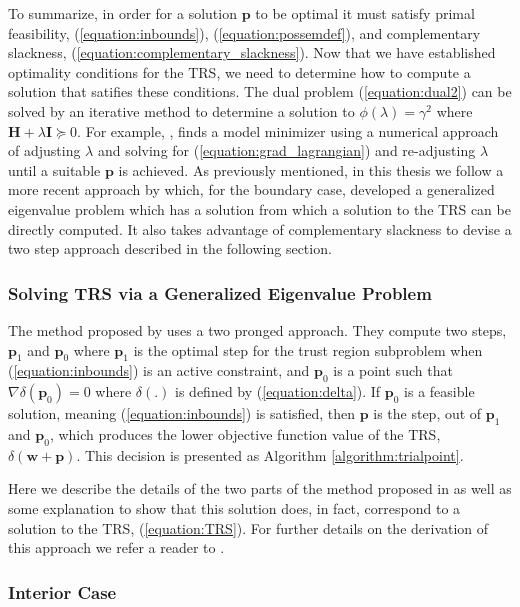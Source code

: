 \documentclass[letterpaper,12pt,titlepage,oneside,final]{book}
\begin{document}
	To summarize, in order for a solution $\mathbf{p}$ to be optimal it must satisfy primal feasibility, (\ref{equation:inbounds}), (\ref{equation:possemdef}), and complementary slackness, (\ref{equation:complementary_slackness}). Now that we have established optimality conditions for the TRS, we need to determine how to compute a solution that satifies these conditions. The dual problem (\ref{equation:dual2}) can be solved by an iterative method to determine a solution to $\phi(\lambda) = \gamma^{2}$ where $\mathbf{H} + \lambda \mathbf{I} \succeq 0$. For example, \cite{TRM.book}, finds a model minimizer using a numerical approach of adjusting $\lambda$ and solving for (\ref{equation:grad_lagrangian}) and re-adjusting $\lambda$ until a suitable $\mathbf{p}$ is achieved. As previously mentioned, in this thesis we follow a more recent approach by \cite{adachi.paper} which, for the boundary case, developed a generalized eigenvalue problem which has a solution from which a solution to the TRS can be directly computed. It also takes advantage of complementary slackness to devise a two step approach described in the following section.
	
	\subsubsection{Solving TRS via a Generalized Eigenvalue Problem}
	
	The method proposed by \cite{adachi.paper} uses a two pronged approach. They compute two steps, $\mathbf{p}_{1}$ and $\mathbf{p}_{0}$ where $\mathbf{p}_{1}$ is the optimal step for the trust region subproblem when (\ref{equation:inbounds}) is an active constraint, and $\mathbf{p}_{0}$ is a point such that $\nabla\delta(\mathbf{p}_{0}) = 0$ where $\delta(.)$ is defined by (\ref{equation:delta}). If $\mathbf{p}_{0}$ is a feasible solution, meaning (\ref{equation:inbounds}) is satisfied, then $\mathbf{p}$ is the step, out of $\mathbf{p}_{1}$ and $\mathbf{p}_{0}$, which produces the lower objective function value of the TRS, $\delta(\mathbf{w + p})$. This decision is presented as Algorithm \ref{algorithm:trialpoint}.
	
	Here we describe the details of the two parts of the method proposed in \cite{adachi.paper} as well as some explanation to show that this solution does, in fact, correspond to 
	a solution to the TRS, (\ref{equation:TRS}). For further details on the derivation of this approach we refer a reader to \cite{adachi.paper}. 
	
	\subsubsection{Interior Case}
	
\end{document}
